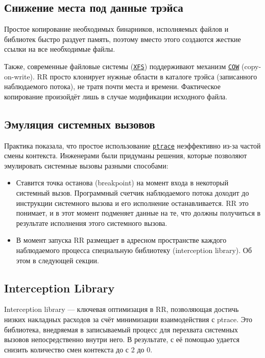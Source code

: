 \subsection{Снижение места под данные трэйса}

Простое копирование необходимых бинарников, исполняемых файлов и библиотек быстро раздует память, 
поэтому вместо этого создаются жесткие ссылки 
на все необходимые файлы.

Также, современные файловые системы (\href{https://ru.wikipedia.org/wiki/XFS}{\texttt{XFS}})
поддерживают механизм \href{https://en.wikipedia.org/wiki/Copy-on-write}{\texttt{COW}} (copy-on-write). 
RR просто клонирует нужные области в каталоге трэйса (записанного наблюдаемого потока), не тратя почти места и времени. 
Фактическое копирование произойдёт лишь в случае модификации исходного файла.

\subsection{Эмуляция системных вызовов}

Практика показала, что простое использование \href{https://man7.org/linux/man-pages/man2/ptrace.2.html}{\texttt{ptrace}} 
неэффективно из-за частой смены контекста.
Инженерами \cite{rr-paper} были придуманы решения, которые позволяют эмулировать системные вызовы разными способами:

\begin{itemize}
  \item Ставится точка останова (breakpoint) на момент входа в некоторый системный вызов. 
  Программный счетчик наблюдаемого потока доходит до инструкции системного вызова и его исполнение останавливается. 
  RR это понимает, и в этот момент подменяет данные на те, что должны получиться в результате 
  исполнения этого системного вызова.
  \item В момент запуска RR размещает в адресном пространстве каждого наблюдаемого процесса специальную библиотеку 
  (interception library). Об этом в следующей секции.
\end{itemize}

\subsection{Interception Library}

Interception library — ключевая оптимизация в RR, позволяющая достичь низких накладных расходов за счёт минимизации взаимодействия с ptrace.
Это библиотека, внедряемая в записываемый процесс для перехвата системных вызовов непосредственно внутри него. 
В результате, с её помощью удается снизить количество смен контекста до с 2 до 0.
